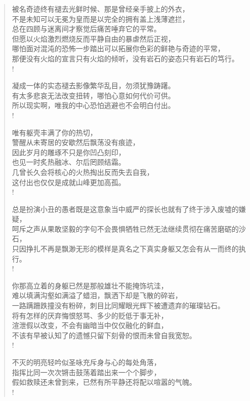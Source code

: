 \documentclass[UTF8, 12pt, a4paper]{ctexrep} %
\begin{document}
\begin{verse}
被名奇迹终有褪去光鲜时候、那是曾经亲手披上的外衣，\\
不是未知可以无冕为皇而是以完全的拥有盖上浅薄遮拦，\\
总在四顾与迷离间才察觉后痛苦唾弃它的平常。\\
但愿以火焰激烈燃烧反而平静自由的暴虐然后正视，\\
哪怕面对混沌的恐怖一步踏出可以拓展你色彩的鲜艳与奇迹的平常，\\
那便没有火焰的宣言只有火焰的倾听，没有岩石的姿态只有岩石的笃行。\\!

凝成一体的实态褪去影像繁华乱目，勿须犹豫踌躇。\\
有太多悲哀无法改变扭转，哪怕心意如何代价可供。\\
所以现实啊，唯我的中心恐怕逃避也不会明白付出。\\!

唯有躯壳丰满了你的热切，\\
警醒从未寄居的安歇然后飘荡没有痕迹，\\
因此岁月的雕琢不只是你凹凸刻印，\\
也见一时炙热融冰、尔后罔顾结霜。\\
几曾长久会将核心的火热掏出反而失去自我，\\
这付出也仅仅是成就山峰更加高孤。\\!

总是扮演小丑的愚者既是这意象当中威严的探长也就有了终于涉入废墟的嫌疑，\\
呵斥之声从果敢坚毅的字句不会畏惧牺牲已然无法继续贯彻在痛苦磨砺的沙石，\\
只因挣扎不再是飘渺无形的模样是真名之下真实身躯又怎会有从一而终的执行。\\!

你那高立着的身躯已然是那般雄壮不能掩饰坑洼，\\
难以填满沟壑如满溢了蜡泪，飘洒下却是飞散的碎岩，\\
一路蹒跚跌撞没有粉碎，刺目比同耀眼光辉下被遭遗弃的璀璨钻石。\\
将有怎样的厌弃悔恨怒骂、多少的贬低于事无补，\\
渲泄假以改变，不会有幽暗当中仅仅融化的鲜血，\\
不该有早被认知了的遗憾只留下刻骨的恨而未曾自我宽恕。\\!

不灭的明亮轻吟似圣咏充斥身与心的每处角落，\\
指挥比同一次次锵击鼓荡着踏出来一个个脚步，\\
假如救赎还未曾到来，已然有所平静还将配以喧嚣的气魄。\\!


\end{verse}
\end{document}

